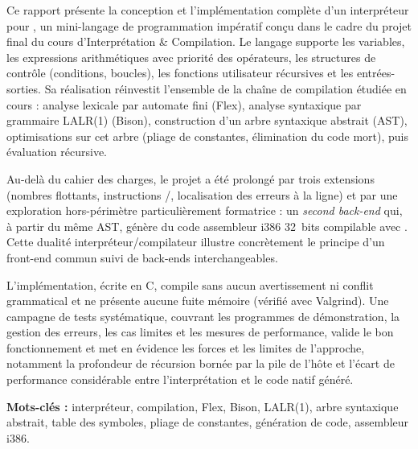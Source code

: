Ce rapport présente la conception et l'implémentation complète d'un interpréteur
pour \ilang, un mini-langage de programmation impératif conçu dans le cadre du
projet final du cours d'Interprétation \& Compilation. Le langage supporte les
variables, les expressions arithmétiques avec priorité des opérateurs, les
structures de contrôle (conditions, boucles), les fonctions utilisateur
récursives et les entrées-sorties. Sa réalisation réinvestit l'ensemble de la
chaîne de compilation étudiée en cours : analyse lexicale par automate fini
(Flex), analyse syntaxique par grammaire LALR(1) (Bison), construction d'un arbre
syntaxique abstrait (AST), optimisations sur cet arbre (pliage de constantes,
élimination du code mort), puis évaluation récursive.

Au-delà du cahier des charges, le projet a été prolongé par trois extensions
(nombres flottants, instructions /, localisation
des erreurs à la ligne) et par une exploration hors-périmètre particulièrement
formatrice : un \emph{second back-end} qui, à partir du même AST, génère du code
assembleur i386 32~bits compilable avec . Cette dualité
interpréteur/compilateur illustre concrètement le principe d'un front-end commun
suivi de back-ends interchangeables.

L'implémentation, écrite en C, compile sans aucun avertissement ni conflit
grammatical et ne présente aucune fuite mémoire (vérifié avec Valgrind). Une
campagne de tests systématique, couvrant les programmes de démonstration, la
gestion des erreurs, les cas limites et les mesures de performance, valide le bon
fonctionnement et
met en évidence les forces et les limites de l'approche, notamment la profondeur
de récursion bornée par la pile de l'hôte et l'écart de performance considérable
entre l'interprétation et le code natif généré.

\vspace{0.5cm}
\noindent\textbf{Mots-clés :} interpréteur, compilation, Flex, Bison, LALR(1),
arbre syntaxique abstrait, table des symboles, pliage de constantes, génération
de code, assembleur i386.
